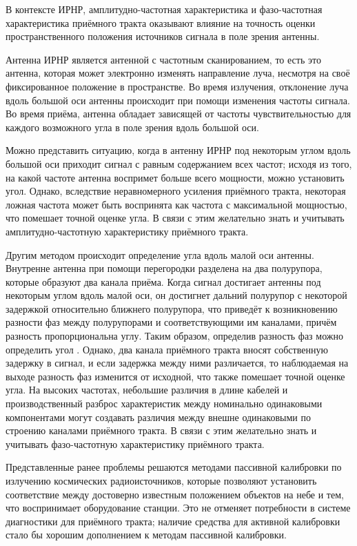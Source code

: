 \documentclass{report}
\begin{document}

В контексте ИРНР, амплитудно-частотная характеристика и фазо-частотная характеристика приёмного тракта оказывают влияние на точность оценки пространственного положения источников сигнала в поле зрения антенны.

Антенна ИРНР является антенной с частотным сканированием, то есть это антенна, которая может электронно изменять направление луча, несмотря на своё фиксированное положение в пространстве. Во время излучения, отклонение луча вдоль большой оси антенны происходит при помощи изменения частоты сигнала. Во время приёма, антенна обладает зависящей от частоты чувствительностью для каждого возможного угла в поле зрения вдоль большой оси.

Можно представить ситуацию, когда в антенну ИРНР под некоторым углом вдоль большой оси приходит сигнал с равным содержанием всех частот; исходя из того, на какой частоте антенна воспримет больше всего мощности, можно установить угол. Однако, вследствие неравномерного усиления приёмного тракта, некоторая ложная частота может быть воспринята как частота с максимальной мощностью, что помешает точной оценке угла. В связи с этим желательно знать и учитывать амплитудно-частотную характеристику приёмного тракта.

Другим методом происходит определение угла вдоль малой оси антенны. Внутренне антенна при помощи перегородки разделена на два полурупора, которые образуют два канала приёма. Когда сигнал достигает антенны под некоторым углом вдоль малой оси, он достигнет дальний полурупор с некоторой задержкой относительно ближнего полурупора, что приведёт к возникновению разности фаз между полурупорами и соответствующими им каналами, причём разность пропорциональна углу. Таким образом, определив разность фаз можно определить угол \cite{interferometry}. Однако, два канала приёмного тракта вносят собственную задержку в сигнал, и если задержка между ними различается, то наблюдаемая на выходе разность фаз изменится от исходной, что также помешает точной оценке угла. На высоких частотах, небольшие различия в длине кабелей и производственный разброс характеристик между номинально одинаковыми компонентами могут создавать различия между внешне одинаковыми по строению каналами приёмного тракта. В связи с этим желательно знать и учитывать фазо-частотную характеристику приёмного тракта.

Представленные ранее проблемы решаются методами пассивной калибровки по излучению космических радиоисточников, которые позволяют установить соответствие между достоверно известным положением объектов на небе и тем, что воспринимает оборудование станции. Это не отменяет потребности в системе диагностики для приёмного тракта; наличие средства для активной калибровки стало бы хорошим дополнением к методам пассивной калибровки.
\end{document}
